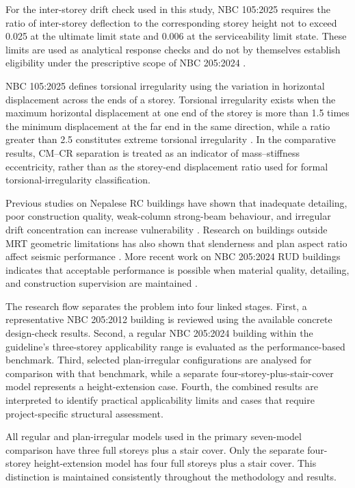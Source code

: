 For the inter-storey drift check used in this study, NBC 105:2025 requires the ratio of inter-storey deflection to the corresponding storey height not to exceed 0.025 at the ultimate limit state and 0.006 at the serviceability limit state. These limits are used as analytical response checks and do not by themselves establish eligibility under the prescriptive scope of NBC 205:2024 \cite{nbc105_2025}.



NBC 105:2025 defines torsional irregularity using the variation in horizontal displacement across the ends of a storey. Torsional irregularity exists when the maximum horizontal displacement at one end of the storey is more than 1.5 times the minimum displacement at the far end in the same direction, while a ratio greater than 2.5 constitutes extreme torsional irregularity \cite{nbc105_2025}. In the comparative results, CM--CR separation is treated as an indicator of mass--stiffness eccentricity, rather than as the storey-end displacement ratio used for formal torsional-irregularity classification.

Previous studies on Nepalese RC buildings have shown that inadequate detailing, poor construction quality, weak-column strong-beam behaviour, and irregular drift concentration can increase vulnerability \cite{chaulagain2013seismic}. Research on buildings outside MRT geometric limitations has also shown that slenderness and plan aspect ratio affect seismic performance \cite{poudel2017seismic}. More recent work on NBC 205:2024 RUD buildings indicates that acceptable performance is possible when material quality, detailing, and construction supervision are maintained \cite{poudel2025seismic}.

The research flow separates the problem into four linked stages. First, a representative NBC 205:2012 building is reviewed using the available concrete design-check results. Second, a regular NBC 205:2024 building within the guideline's three-storey applicability range is evaluated as the performance-based benchmark. Third, selected plan-irregular configurations are analysed for comparison with that benchmark, while a separate four-storey-plus-stair-cover model represents a height-extension case. Fourth, the combined results are interpreted to identify practical applicability limits and cases that require project-specific structural assessment.

All regular and plan-irregular models used in the primary seven-model comparison have three full storeys plus a stair cover. Only the separate four-storey height-extension model has four full storeys plus a stair cover. This distinction is maintained consistently throughout the methodology and results.

